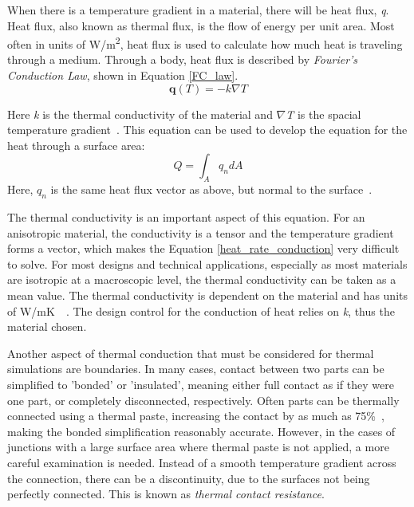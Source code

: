 When there is a temperature gradient in a material, there will be heat flux, \textit{q}. Heat flux, also known as thermal flux, is the flow of energy per unit area. Most often in units of W/m\textsuperscript{2}, heat flux is used to calculate how much heat is traveling through a medium. Through a body, heat flux is described by \textit{Fourier’s Conduction Law}, shown in Equation \ref{FC_law}.
\begin{equation} \label{FC_law}
    \bm{q}(T) = -k\nabla T
\end{equation}

Here \textit{k} is the thermal conductivity of the material and $\nabla$\textit{T} is the spacial temperature gradient~\citep{heat_transfer_textbook}. This equation can be used to develop the equation for the heat through a surface area:
\begin{equation} \label{heat_rate_conduction}
    Q = \int_{A}q_ndA
\end{equation}
Here, $q_n$ is the same heat flux vector as above, but normal to the surface~\citep{Heat_Transfer_Basics}.

The thermal conductivity is an important aspect of this equation. For an anisotropic material, the conductivity is a tensor and the temperature gradient forms a vector, which makes the Equation \ref{heat_rate_conduction} very difficult to solve. For most designs and technical applications, especially as most materials are isotropic at a macroscopic level, the thermal conductivity can be taken as a mean value. The thermal conductivity is dependent on the material and has units of W/mK~\citep{heat_transfer_textbook}~\citep{FEA_SW}. The design control for the conduction of heat relies on \textit{k}, thus the material chosen. 

Another aspect of thermal conduction that must be considered for thermal simulations are boundaries. In many cases, contact between two parts can be simplified to 'bonded' or 'insulated', meaning either full contact as if they were one part, or completely disconnected, respectively. Often parts can be thermally connected using a thermal paste, increasing the contact by as much as 75\%~\citep{Heat_Transfer_Resistance}, making the bonded simplification reasonably accurate. However, in the cases of junctions with a large surface area where thermal paste is not applied, a more careful examination is needed. Instead of a smooth temperature gradient across the connection, there can be a discontinuity, due to the surfaces not being perfectly connected. This is known as \textit{thermal contact resistance}. 

